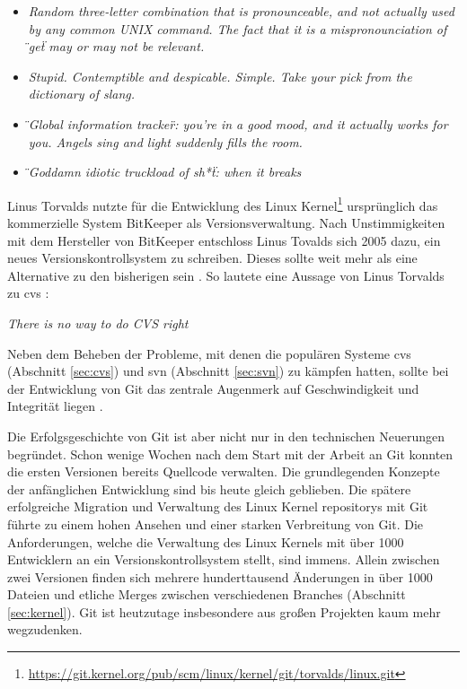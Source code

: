 \begin{itemize}
  \item \textit{\glqq{}Random three-letter combination that is pronounceable,
  and not actually used by any common UNIX command. The fact that it is a
  mispronounciation of \"{}get\"{} may or may not be relevant.\grqq{}}
  \item \textit{\glqq{}Stupid. Contemptible and despicable. Simple. Take your
  pick from the dictionary of slang.\grqq{}}
  \item \textit{\glqq{}\"{}Global information tracker\"{}: you're in a good
  mood, and it actually works for you. Angels sing and light suddenly fills the
  room.\grqq{}}
  \item \textit{\glqq{}\"{}Goddamn idiotic truckload of sh*t\"{}: when it
  breaks\grqq{}}
\end{itemize}

Linus Torvalds nutzte für die Entwicklung des Linux
Kernel\footnote{\url{https://git.kernel.org/pub/scm/linux/kernel/git/torvalds/linux.git}}
ursprünglich das kommerzielle System BitKeeper als Versionsverwaltung.  Nach
Unstimmigkeiten mit dem Hersteller von BitKeeper entschloss Linus Tovalds sich
2005 dazu, ein neues Versionskontrollsystem zu schreiben. Dieses sollte weit mehr als eine
Alternative zu den bisherigen sein \cite[S.~13]{gitosp}. So lautete eine
Aussage von Linus Torvalds zu \acrshort{cvs} \cite[S.~385]{cd}:

\begin{center}
\textit{\glqq{}There is no way to do CVS right\grqq{}}\\
\end{center}

Neben dem Beheben der Probleme, mit denen die populären Systeme \acrshort{cvs}
(Abschnitt \ref{sec:cvs}) und \acrshort{svn} (Abschnitt \ref{sec:svn}) zu
kämpfen hatten, sollte bei der Entwicklung von Git das zentrale Augenmerk auf
Geschwindigkeit und Integrität liegen \cite[S.~13]{gitosp}.

Die Erfolgsgeschichte von Git ist aber nicht nur in den technischen Neuerungen
begründet. Schon wenige Wochen nach dem Start mit der Arbeit an Git konnten die
ersten Versionen bereits Quellcode verwalten. Die grundlegenden Konzepte der
anfänglichen Entwicklung sind bis heute gleich geblieben. Die spätere
erfolgreiche Migration und Verwaltung des Linux Kernel \glspl{repository}
mit Git führte zu einem hohen Ansehen und einer starken Verbreitung von Git.
Die Anforderungen, welche die Verwaltung des Linux Kernels mit über 1000
Entwicklern an ein Versionskontrollsystem stellt, sind immens. Allein zwischen
zwei Versionen finden sich mehrere hunderttausend Änderungen in über 1000
Dateien und etliche Merges zwischen verschiedenen Branches (Abschnitt
\ref{sec:kernel}). Git ist heutzutage insbesondere aus großen Projekten
kaum mehr wegzudenken. \cite[S.~13]{gitosp}

